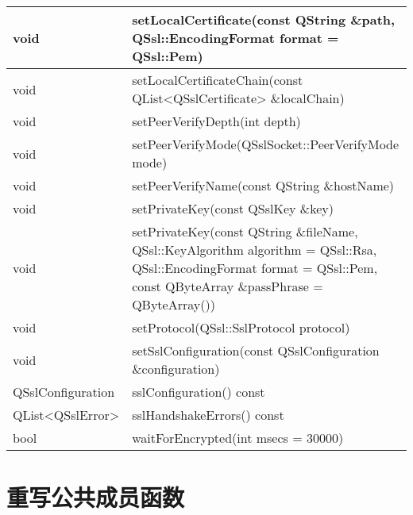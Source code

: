 \begin{longtable}[l]{|l|m{30em}|}
\hline
void 	&setLocalCertificate(const QString \&path, QSsl::EncodingFormat format = QSsl::Pem) \\ 
\hline
void &	setLocalCertificateChain(const QList<QSslCertificate> \&localChain) \\
\hline
void &	setPeerVerifyDepth(int depth) \\ 
\hline
void &	setPeerVerifyMode(QSslSocket::PeerVerifyMode mode) \\
\hline
void &	setPeerVerifyName(const QString \&hostName) \\ 
\hline
void &	setPrivateKey(const QSslKey \&key) \\ 
\hline 
void 	&setPrivateKey(const QString \&fileName, QSsl::KeyAlgorithm algorithm = QSsl::Rsa, QSsl::EncodingFormat format = QSsl::Pem, const QByteArray \&passPhrase = QByteArray()) \\ 
\hline
void &	setProtocol(QSsl::SslProtocol protocol) \\ 
\hline
void &	setSslConfiguration(const QSslConfiguration \&configuration) \\ 
\hline
QSslConfiguration &	sslConfiguration() const \\ 
\hline
QList<QSslError> 	&sslHandshakeErrors() const \\ 
\hline
bool 	&waitForEncrypted(int msecs = 30000) \\ 
\hline 
\end{longtable}



\section{重写公共成员函数}

